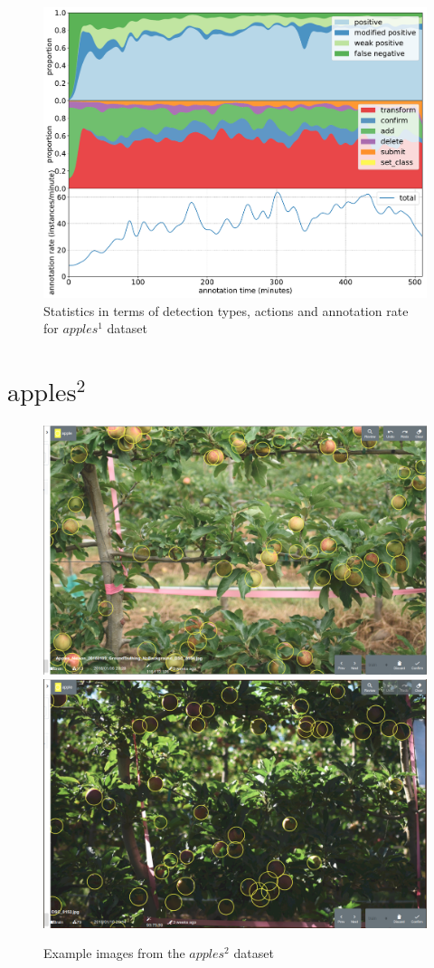 \begin{figure}[!h]
\centering
\includegraphics[width=1.0\linewidth]{charts/action_annotations/apples1.pdf}
\caption{Statistics in terms of detection types, actions and annotation rate for $apples^1$ dataset}
\label{fig:apples1_annotation}
\end{figure}

\pagebreak
\section{$\mathrm{apples^2}$}
\label{sec:apples2_details}


\begin{figure}[!h]
  \includegraphics[width=0.475\linewidth]{figures/annotation/screenshots/apples2.png}
  \hfill
  \includegraphics[width=0.475\linewidth]{figures/annotation/screenshots/apples2_dark.png}
\caption{Example images from the $apples^2$ dataset}
\label{fig:apples2_dataset}  
\end{figure}

